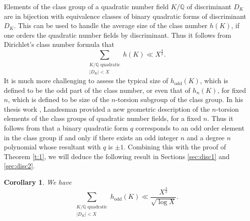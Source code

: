 \documentclass[reqno, 12pt, twoside]{amsart}
\numberwithin{equation}{section}
\newcommand{\QQ}{\mathbb{Q}}
\newcommand{\0}{\mathbf{0}}
\newtheorem{corollary}[theorem]{Corollary}
\theoremstyle{definition}
\begin{document}
Elements of the 
class group of a quadratic number field $K/\QQ$ of discriminant $D_K$ are in bijection with equivalence classes 
of binary quadratic forms of discriminant $D_K$. This can be used to 
handle the average size of the class number $h(K)$, if one orders the quadratic number fields by discriminant. Thus it follows from Dirichlet's class number formula that 
\begin{equation}\label{eq:class}
\sum_{
\substack{K/\QQ \text{ quadratic}\\
|D_K| < X
}}  h(K)\ll   X^{\frac{3}{2}}.
\end{equation}
It is much more challenging  to assess the typical  size of 
$h_\text{odd}(K)$, which is defined to be the odd part of the class number, or even that of  
$h_n(K)$, for fixed $n$, which is defined to be size of the $n$-torsion subgroup of the  class group. 
In his thesis work \cite{aaron}, Landesman provided
a new geometric description of the $n$-torsion elements of the class groups of quadratic number fields, for a fixed $n$. Thus it follows from 
\cite[Thm.~1.1]{aaron} that a binary quadratic form $q$ corresponds to an odd order 
 element in the class group 
 if and only if there exists an odd integer $n$ 
and a degree $n$ polynomial whose resultant with $q$ is $\pm 1$. Combining this with the proof of 
Theorem \ref{t:1}, we will deduce the following result in Sections \ref{sec:disc1} and \ref{sec:disc2}.

 

\begin{corollary}\label{cor:1.2}
We have 
$$
\sum_{
\substack{K/\QQ \text{ quadratic}\\
|D_K|<X
}}  h_\text{odd}(K)\ll \frac{X^{\frac{3}{2}}}{\sqrt{\log X}}.
$$
\end{corollary}
\end{document}
